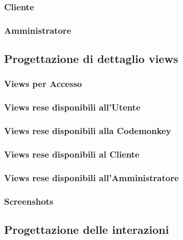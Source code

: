 \documentclass{article}
\begin{document}
\subsubsection{Cliente}

\subsubsection{Amministratore}


\subsection{Progettazione di dettaglio views}
\subsubsection{Views per Accesso}

\subsubsection{Views rese disponibili all'Utente}

\subsubsection{Views rese disponibili alla Codemonkey}

\subsubsection{Views rese disponibili al Cliente}

\subsubsection{Views rese disponibili all'Amministratore}

\subsubsection{Screenshots}


\subsection{Progettazione delle interazioni}
\end{document}
